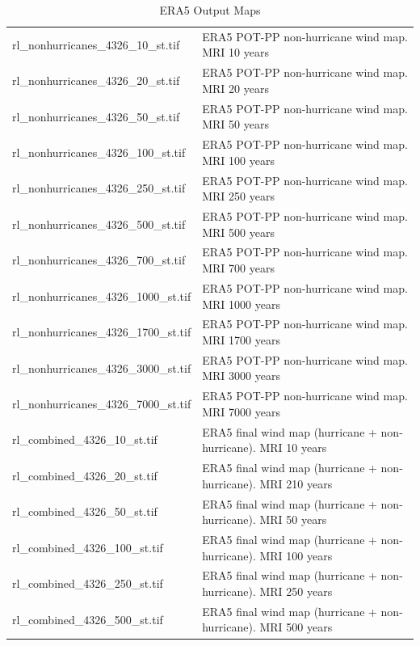 \documentclass[12pt,oneside]{reedthesis}
\begin{document}
\begingroup\fontsize{8}{10}\selectfont
\begin{longtable}[t]{>{\raggedright\arraybackslash}p{2in}>{\raggedright\arraybackslash}p{3.6in}}
\caption[ERA5 Output Maps]{\label{tab:era5maps}ERA5 Output Maps}\\
\toprule
\multicolumn{1}{l}{File} & \multicolumn{1}{l}{Description}\\
\midrule
rl\_nonhurricanes\_4326\_10\_st.tif & ERA5 POT-PP non-hurricane wind map. MRI 10 years\\
rl\_nonhurricanes\_4326\_20\_st.tif & ERA5 POT-PP non-hurricane wind map. MRI 20 years\\
rl\_nonhurricanes\_4326\_50\_st.tif & ERA5 POT-PP non-hurricane wind map. MRI 50 years\\
rl\_nonhurricanes\_4326\_100\_st.tif & ERA5 POT-PP non-hurricane wind map. MRI 100 years\\
rl\_nonhurricanes\_4326\_250\_st.tif & ERA5 POT-PP non-hurricane wind map. MRI 250 years\\
rl\_nonhurricanes\_4326\_500\_st.tif & ERA5 POT-PP non-hurricane wind map. MRI 500 years\\
rl\_nonhurricanes\_4326\_700\_st.tif & ERA5 POT-PP non-hurricane wind map. MRI 700 years\\
rl\_nonhurricanes\_4326\_1000\_st.tif & ERA5 POT-PP non-hurricane wind map. MRI 1000 years\\
rl\_nonhurricanes\_4326\_1700\_st.tif & ERA5 POT-PP non-hurricane wind map. MRI 1700 years\\
rl\_nonhurricanes\_4326\_3000\_st.tif & ERA5 POT-PP non-hurricane wind map. MRI 3000 years\\
rl\_nonhurricanes\_4326\_7000\_st.tif & ERA5 POT-PP non-hurricane wind map. MRI 7000 years\\
rl\_combined\_4326\_10\_st.tif & ERA5 final wind map (hurricane + non-hurricane). MRI 10 years\\
rl\_combined\_4326\_20\_st.tif & ERA5 final wind map (hurricane + non-hurricane). MRI 210 years\\
rl\_combined\_4326\_50\_st.tif & ERA5 final wind map (hurricane + non-hurricane). MRI 50 years\\
rl\_combined\_4326\_100\_st.tif & ERA5 final wind map (hurricane + non-hurricane). MRI 100 years\\
rl\_combined\_4326\_250\_st.tif & ERA5 final wind map (hurricane + non-hurricane). MRI 250 years\\
rl\_combined\_4326\_500\_st.tif & ERA5 final wind map (hurricane + non-hurricane). MRI 500 years\\

\end{longtable}
\end{document}
